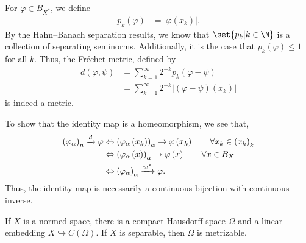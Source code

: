 \documentclass[10pt]{mypackage}
\begin{document}
\begin{solution}
  For $\varphi\in B_{X^{\ast}}$, we define
  \begin{align*}
    p_k\left(\varphi\right) &= \left\vert \varphi\left(x_k\right) \right\vert.
  \end{align*}
  By the Hahn--Banach separation results, we know that $\set{p_k | k\in \N}$ is a collection of separating seminorms. Additionally, it is the case that $p_k\left(\varphi\right) \leq 1$ for all $k$. Thus, the Fréchet metric, defined by
  \begin{align*}
    d\left(\varphi,\psi\right) &= \sum_{k=1}^{\infty}2^{-k}p_k\left(\varphi - \psi\right)\\
                               &= \sum_{k=1}^{\infty}2^{-k}\left\vert \left(\varphi - \psi\right)\left(x_k\right) \right\vert
  \end{align*}
  is indeed a metric.\newline

  To show that the identity map is a homeomorphism, we see that, 
  \begin{align*}
    \left(\varphi_{\alpha}\right)_n\xrightarrow{d} \varphi &\Leftrightarrow \left(\varphi_{\alpha}\left(x_k\right)\right)_{\alpha} \rightarrow \varphi\left(x_k\right)\tag*{$\forall x_k\in \left(x_k\right)_k$}\\
                                                           &\Leftrightarrow \left(\varphi_{\alpha}\left(x\right)\right)_{\alpha}\rightarrow \varphi\left(x\right) \tag*{$\forall x\in B_{X}$}\\
                                                           &\Leftrightarrow \left(\varphi_{\alpha}\right)_{\alpha}\xrightarrow{w^{\ast}}\varphi.
  \end{align*}
  Thus, the identity map is necessarily a continuous bijection with continuous inverse.
\end{solution}
\begin{corollary}
  If $X$ is a normed space, there is a compact Hausdorff space $\Omega$ and a linear embedding $X\hookrightarrow C\left(\Omega\right)$. If $X$ is separable, then $\Omega$ is metrizable.
\end{corollary}
\end{document}
